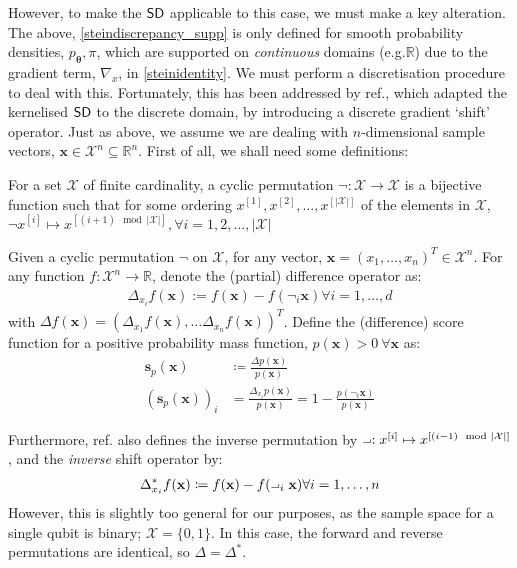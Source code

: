 However, to make the $\operatorname{\textsf{SD}}$ applicable to this case, we must make a key alteration. The above, \eqref{steindiscrepancy_supp} is only defined for smooth probability densities, $p_{\boldsymbol\theta}, \pi$, which are supported on \textit{continuous} domains (e.g.\@ $\mathbb{R}$) due to the gradient term, $\nabla_x$, in \eqref{steinidentity}. We must perform a discretisation procedure to deal with this. Fortunately, this has been addressed by ref., which adapted the kernelised $\operatorname{\textsf{SD}}$ to the discrete domain, by introducing a discrete gradient `shift' operator. Just as above, we assume we are dealing with $n$-dimensional sample vectors, $\mathbf{x}\in \mathcal{X}^n \subseteq \mathbb{R}^n$. First of all, we shall need some definitions:

\begin{definition}
For a set $\mathcal{X}$ of finite cardinality, a cyclic permutation $\neg:\mathcal{X} \rightarrow \mathcal{X}$ is a bijective function such that for some ordering $x^{[1]},x^{[2]}, \dots, x^{[|\mathcal{X}|]}$ of the elements in $\mathcal{X}$, $\neg x^{[i]} \mapsto x^{[(i+1)\mod|\mathcal{X}|]}, \forall i = 1,2,\dots, |\mathcal{X}|$
\end{definition}
\begin{definition}
Given a cyclic permutation  $\neg$ on $\mathcal{X}$, for any vector, $\mathbf{x} = (x_1, \dots, x_n)^T \in \mathcal{X}^n$. For any function $f:\mathcal{X}^n \rightarrow \mathbb{R}$, denote the (partial) difference operator as:
\begin{align}
    \Delta_{x_i}f(\mathbf{x}) := f(\mathbf{x}) - f(\neg_i\mathbf{x}) \forall i=1, \dots, d \label{discreteshiftoperator}
\end{align}
with $\Delta f(\mathbf{x}) = (\Delta_{x_1}f(\mathbf{x}), \dots \Delta_{x_n}f(\mathbf{x}))^T$. Define the (difference) score function for a positive probability mass function, $p(\mathbf{x}) > 0 ~\forall \mathbf{x}$ as:
\begin{align}
    \mathbf{s}_p(\mathbf{x}) &  \coloneqq \frac{\Delta p(\mathbf{x})}{p(\mathbf{x})} \label{discretescorefunction}\\
    (\mathbf{s}_p(\mathbf{x}))_i &= \frac{\Delta_{x_i} p(\mathbf{x})}{p(\mathbf{x})} = 1 -  \frac{p(\neg_i\mathbf{x})}{p(\mathbf{x})}
\end{align}
\end{definition}
Furthermore, ref. also defines the inverse permutation by $\revneg: x^{[i]} \mapsto x^{[(i-1)\mod|\mathcal{X}|]}$, and the \textit{inverse} shift operator by:
\begin{align}
    \Delta^*_{x_i}f(\mathbf{x})  \coloneqq f(\mathbf{x}) - f(\revneg_i\mathbf{x}) \forall i=1, \dots, n \label{inversediscreteshiftoperator}
\end{align}
However, this is slightly too general for our purposes, as the sample space for a single qubit is binary; $\mathcal{X} = \{0, 1\}$. In this case, the forward and reverse permutations are identical, so $\Delta = \Delta^*$.

